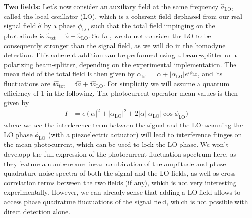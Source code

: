 \noindent \textbf{Two fields: } Let's now consider an auxiliary field at the same frequency $\hat a_{\mathrm{LO}}$, called the local oscillator (LO), which is a coherent field dephased from our real signal field $\hat a$ by a phase $\phi_{\mathrm{LO}}$ such that the total field impinging on the photodiode is $\hat a_{\mathrm{tot}}= \hat a + \hat a_{\mathrm{LO}}$. So far, we do not consider the LO to be consequently stronger than the signal field, as we will do in the homodyne detection. This coherent addition can be performed using a beam-splitter or a polarizing beam-splitter, depending on the experimental implementation. The mean field of the total field is then given by $\bar \alpha_{\mathrm{tot}} = \bar \alpha + |\bar \alpha_{\mathrm{LO}}|e^{i\phi_{\mathrm{LO}}}$, and its fluctuations are $\delta \hat a_{\mathrm{tot}} = \delta \hat a + \delta \hat a_{\mathrm{LO}}$. For simplicity we will assume a quantum efficiency of 1 in the following. The photocurrent operator mean values is then given by 
\begin{equation}
  \begin{split}
    \bar I &= e \, \bigg(|\bar \alpha|^2 + |\bar \alpha_{\mathrm{LO}}|^2 + 2 |\bar \alpha| |\bar \alpha_{\mathrm{LO}}| \cos \phi_{\mathrm{LO}} \bigg)
  \end{split}
\end{equation}
where we see the interference term between the signal and the LO: scanning the LO phase $\phi_{\mathrm{LO}}$ (with a piezoelectric actuator) will lead to interference fringes on the mean photocurrent, which can be used to lock the LO phase. We won't developp the full expression of the photocurrent fluctuation spectrum here, as they feature a cumbersome linear combination of the amplitude and phase quadrature noise spectra of both the signal and the LO fields, as well as cross-correlation terms between the two fields (if any), which is not very interesting experimentally. However, we can already sense that adding a LO field allows to access phase quadrature fluctuations of the signal field, which is not possible with direct detection alone. \\

